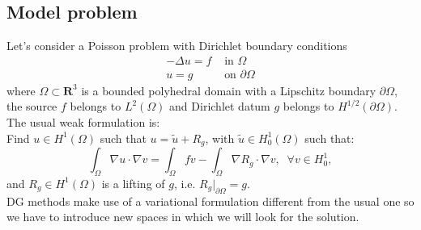 \documentclass[12pt, a4paper]{article}
\begin{document}
\subsection{Model problem}
Let's consider a Poisson problem with Dirichlet boundary conditions
\begin{align} \label{eq:poisson}
	-\Delta u = f & \mbox{ in } \Omega\\
			u = g & \mbox{ on } \partial \Omega
\end{align}
where $\Omega \subset \mathbf{R}^3$ is a bounded polyhedral domain with a Lipschitz boundary $\partial \Omega$, the source $f$ belongs to $L^2(\Omega)$ and Dirichlet datum $g$ belongs to $H^{1/2}(\partial \Omega)$.
The usual weak formulation is:\\
Find $u \in H^1(\Omega)$ such that $u = \tilde{u} + R_g$, with $\tilde{u} \in H^1_0(\Omega)$ such that:
\begin{equation} \label{eq:wform}
	\int_\Omega \nabla u \cdot \nabla v
	= \int_\Omega fv - \int_\Omega \nabla R_g \cdot \nabla v, \;\; \forall v \in H^1_0,
\end{equation}
and $R_g \in H^1(\Omega)$ is a lifting of $g$, i.e. $R_g|_{\partial \Omega} = g$.\\
DG methods make use of a variational formulation different from the usual one so we have to introduce new spaces in which we will look for the solution.
\end{document}
